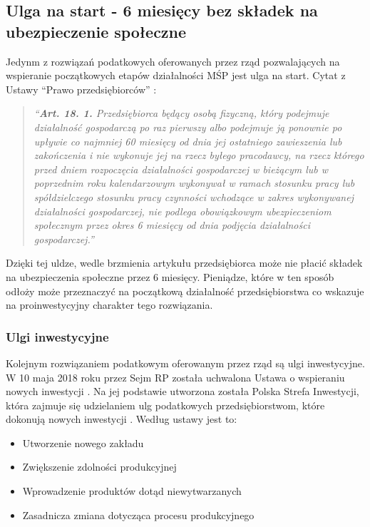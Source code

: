 \documentclass[11pt]{article}
\newenvironment{itquote}
  {\begin{quote} \begin{center}\itshape}
  {\end{center}  \end{quote}   \ignorespacesafterend}
\begin{document}
\subsection*{Ulga na start - 6 miesięcy bez składek na ubezpieczenie społeczne}

Jedynm z rozwiązań podatkowych oferowanych przez rząd pozwalających na wspieranie początkowych etapów działalności MŚP jest ulga na start.
Cytat z Ustawy ``Prawo przedsiębiorców'' \cite{PrawoPrzedsiębiorców}:

\begin{itquote}
  ``\textbf{Art. 18. 1.} Przedsiębiorca będący osobą fizyczną, który podejmuje działalność
  gospodarczą po raz pierwszy albo podejmuje ją ponownie po upływie co najmniej
  60 miesięcy od dnia jej ostatniego zawieszenia lub zakończenia i nie wykonuje jej na
  rzecz byłego pracodawcy, na rzecz którego przed dniem rozpoczęcia działalności
  gospodarczej w bieżącym lub w poprzednim roku kalendarzowym wykonywał
  w ramach stosunku pracy lub spółdzielczego stosunku pracy czynności wchodzące
  w zakres wykonywanej działalności gospodarczej, nie podlega obowiązkowym
  ubezpieczeniom społecznym przez okres 6 miesięcy od dnia podjęcia działalności
  gospodarczej.''
\end{itquote}

Dzięki tej uldze, wedle brzmienia artykułu przedsiębiorca może nie płacić składek na ubezpieczenia społeczne
przez 6 miesięcy. Pieniądze, które w ten sposób odłoży może przeznaczyć na początkową działalność przedsiębiorstwa co
wskazuje na proinwestycyjny charakter tego rozwiązania.

\subsubsection*{Ulgi inwestycyjne}

Kolejnym rozwiązaniem podatkowym oferowanym przez rząd są ulgi inwestycyjne.
W 10 maja 2018 roku przez Sejm RP została uchwalona Ustawa o wspieraniu nowych inwestycji \cite{UstawaOInwestycjach}.
Na jej podstawie utworzona została Polska Strefa Inwestycji, która zajmuje się udzielaniem ulg podatkowych przedsiębiorstwom,
które dokonują nowych inwestycji \cite{PolskaStrefaInwestycji}. Według ustawy jest to:
\begin{itemize}
  \item Utworzenie nowego zakładu
  \item Zwiększenie zdolności produkcyjnej
  \item Wprowadzenie produktów dotąd niewytwarzanych
  \item Zasadnicza zmiana dotycząca procesu produkcyjnego
\end{itemize}
\end{document}
